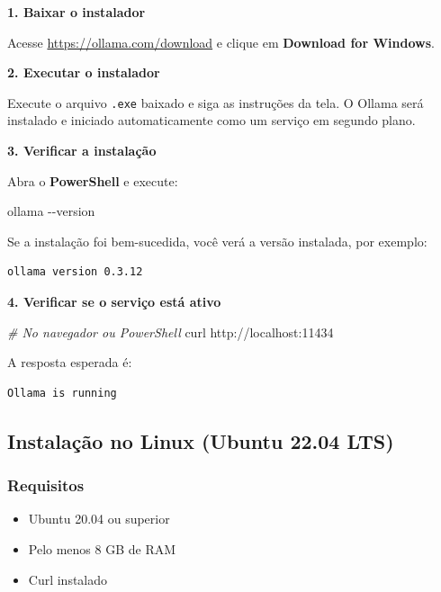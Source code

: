 \documentclass[
]{article}
\newenvironment{Shaded}{\begin{snugshade}}{\end{snugshade}}
\newcommand{\AttributeTok}[1]{\textcolor[rgb]{0.13,0.29,0.53}{#1}}
\newcommand{\CommentTok}[1]{\textcolor[rgb]{0.56,0.35,0.01}{\textit{#1}}}
\newcommand{\ExtensionTok}[1]{#1}
\newcommand{\NormalTok}[1]{#1}
\providecommand{\tightlist}{%
  \setlength{\itemsep}{0pt}\setlength{\parskip}{0pt}}
\begin{document}
\textbf{1. Baixar o instalador}

Acesse \url{https://ollama.com/download} e clique em \textbf{Download
for Windows}.

\textbf{2. Executar o instalador}

Execute o arquivo \texttt{.exe} baixado e siga as instruções da tela. O
Ollama será instalado e iniciado automaticamente como um serviço em
segundo plano.

\textbf{3. Verificar a instalação}

Abra o \textbf{PowerShell} e execute:

\begin{Shaded}
\begin{Highlighting}[]
\ExtensionTok{ollama} \AttributeTok{{-}{-}version}
\end{Highlighting}
\end{Shaded}

Se a instalação foi bem-sucedida, você verá a versão instalada, por
exemplo:

\begin{verbatim}
ollama version 0.3.12
\end{verbatim}

\textbf{4. Verificar se o serviço está ativo}

\begin{Shaded}
\begin{Highlighting}[]
\CommentTok{\# No navegador ou PowerShell}
\ExtensionTok{curl}\NormalTok{ http://localhost:11434}
\end{Highlighting}
\end{Shaded}

A resposta esperada é:

\begin{verbatim}
Ollama is running
\end{verbatim}

\subsection{Instalação no Linux (Ubuntu 22.04
LTS)}\label{instalauxe7uxe3o-no-linux-ubuntu-22.04-lts}

\subsubsection{Requisitos}\label{requisitos-1}

\begin{itemize}
\tightlist
\item
  Ubuntu 20.04 ou superior
\item
  Pelo menos 8 GB de RAM
\item
  Curl instalado
\end{itemize}
\end{document}
